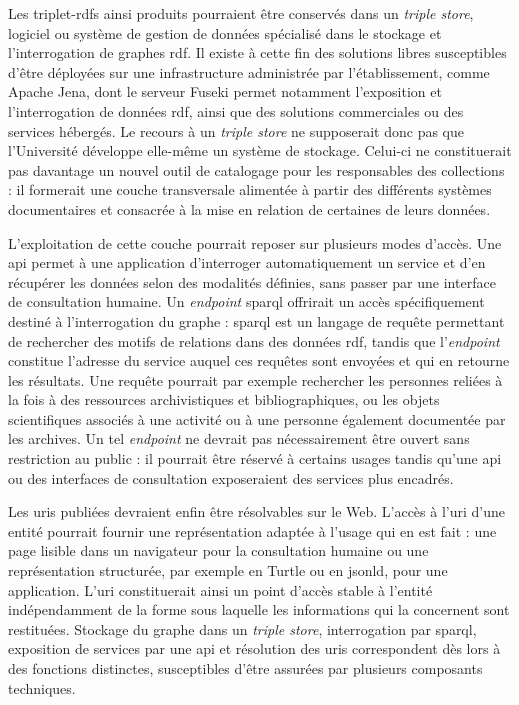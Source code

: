 Les \glspl{triplet-rdf} ainsi produits pourraient être conservés dans un \emph{triple store}, logiciel ou système de gestion de données spécialisé dans le stockage et l'interrogation de graphes \gls{rdf}. Il existe à cette fin des solutions libres susceptibles d'être déployées sur une infrastructure administrée par l'établissement, comme Apache Jena, dont le serveur Fuseki permet notamment l'exposition et l'interrogation de données \gls{rdf}, ainsi que des solutions commerciales ou des services hébergés. Le recours à un \emph{triple store} ne supposerait donc pas que l'Université développe elle-même un système de stockage. Celui-ci ne constituerait pas davantage un nouvel outil de catalogage pour les responsables des collections : il formerait une couche transversale alimentée à partir des différents systèmes documentaires et consacrée à la mise en relation de certaines de leurs données.

L'exploitation de cette couche pourrait reposer sur plusieurs modes d'accès. Une \gls{api} permet à une application d'interroger automatiquement un service et d'en récupérer les données selon des modalités définies, sans passer par une interface de consultation humaine. Un \emph{endpoint} \gls{sparql} offrirait un accès spécifiquement destiné à l'interrogation du graphe : \gls{sparql} est un langage de requête permettant de rechercher des motifs de relations dans des données \gls{rdf}, tandis que l'\emph{endpoint} constitue l'adresse du service auquel ces requêtes sont envoyées et qui en retourne les résultats. Une requête pourrait par exemple rechercher les personnes reliées à la fois à des ressources archivistiques et bibliographiques, ou les objets scientifiques associés à une activité ou à une personne également documentée par les archives. Un tel \emph{endpoint} ne devrait pas nécessairement être ouvert sans restriction au public : il pourrait être réservé à certains usages tandis qu'une \gls{api} ou des interfaces de consultation exposeraient des services plus encadrés.

Les \glspl{uri} publiées devraient enfin être résolvables sur le Web. L'accès à l'\gls{uri} d'une entité pourrait fournir une représentation adaptée à l'usage qui en est fait : une page lisible dans un navigateur pour la consultation humaine ou une représentation structurée, par exemple en Turtle ou en \gls{jsonld}, pour une application. L'\gls{uri} constituerait ainsi un point d'accès stable à l'entité indépendamment de la forme sous laquelle les informations qui la concernent sont restituées. Stockage du graphe dans un \emph{triple store}, interrogation par \gls{sparql}, exposition de services par une \gls{api} et résolution des \glspl{uri} correspondent dès lors à des fonctions distinctes, susceptibles d'être assurées par plusieurs composants techniques.


